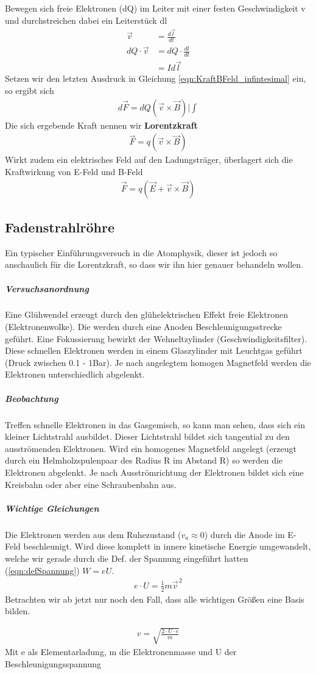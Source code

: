 Bewegen sich freie Elektronen (dQ) im Leiter mit einer festen Geschwindigkeit v und durchstreichen dabei ein Leiterstück dl
\begin{align*}
\vec{v }			&= \frac{d\vec{l}}{dt}\\
dQ \cdot \vec{v} 	&= dQ  \cdot \frac{dl}{dt} \\
			&= I d\vec{l}
\end{align*}
Setzen wir den letzten Ausdruck in Gleichung \ref{eqn:KraftBFeld_infintesimal} ein, so ergibt sich 
\begin{align*}
d\vec{F} = dQ \left( \vec{v} \times \vec{B} \right) \bigg| \int
\end{align*} Die sich ergebende Kraft nennen wir \textbf{Lorentzkraft}
\begin{align} \label{eqn:Lorentzkraft}
\vec{F} = q \left( \vec{v} \times \vec{B} \right)
\end{align}
Wirkt zudem ein elektrisches Feld auf den Ladungsträger, überlagert sich die Kraftwirkung von E-Feld und B-Feld
\begin{align} \label{eqn:Lorentzkraft E-Feld}
\vec{F} = q \left( \vec{E} + \vec{v}  \times \vec{B}\right)
\end{align}
\subsection{Fadenstrahlröhre}
Ein typischer Einführungsversuch in die Atomphysik, dieser ist jedoch so anschaulich für die Lorentzkraft, so dass wir ihn hier genauer behandeln wollen. 
\subparagraph{Versuchsanordnung} Eine Glühwendel erzeugt durch den glühelektrischen Effekt freie Elektronen (Elektronenwolke). Die werden durch eine Anoden Beschleunigungsstrecke geführt. Eine Fokussierung bewirkt der Wehneltzylinder (Geschwindigkeitsfilter).
Diese schnellen Elektronen werden in einem Glaszylinder mit Leuchtgas geführt (Druck zwischen 0.1 - 1Bar). Je nach angelegtem homogen Magnetfeld werden die Elektronen unterschiedlich abgelenkt. 
\subparagraph{Beobachtung}Treffen schnelle Elektronen in das Gasgemisch, so kann man sehen, dass sich ein kleiner Lichtstrahl ausbildet.
Dieser Lichtstrahl  bildet sich tangential zu den ausströmenden Elektronen. Wird ein homogenes Magnetfeld angelegt (erzeugt durch ein Helmholzspulenpaar des Radius R im Abstand R) so werden die Elektronen abgelenkt.
Je nach Ausströmrichtung der Elektronen bildet sich eine Kreisbahn oder aber eine Schraubenbahn aus. 
\subparagraph{Wichtige Gleichungen}
Die Elektronen werden aus dem Ruhezustand ($v_a \approx 0$) durch die Anode im E-Feld beschleunigt. Wird diese komplett in innere kinetische Energie umgewandelt, welche wir gerade durch die Def. der Spannung eingeführt hatten (\ref{eqn:defSpannung}) $W = e  U $.
\begin{align*}
\boxed{e \cdot U = \frac{1}{2}m \vec{v}^{\, 2}}
\end{align*} Betrachten wir ab jetzt nur noch den Fall, dass alle wichtigen Größen eine Basis bilden. \par 
\begin{align} \label{eqn:ElektronenFadenstrahlGeschw}
v = \sqrt{\frac{2 \cdot U \cdot e}{m}}
\end{align}Mit e als Elementarladung, m die Elektronenmasse und U der Beschleunigungsspannung

